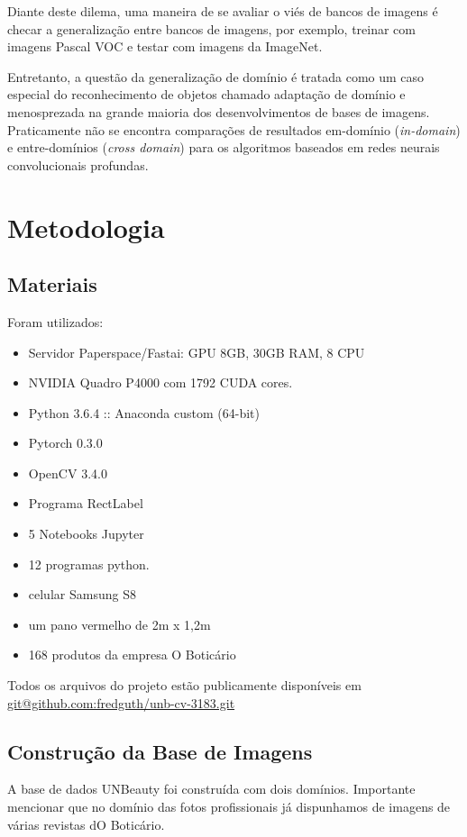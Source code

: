 \documentclass[conference]{IEEEtran}
\begin{document}
Diante deste dilema, uma maneira de se avaliar o viés de bancos de imagens é checar a generalização entre bancos de imagens, por exemplo, treinar com imagens Pascal VOC e testar com imagens da ImageNet\cite{bias}.

Entretanto, a questão da generalização de domínio é tratada como um caso especial do reconhecimento de objetos chamado adaptação de domínio e menosprezada na grande maioria dos desenvolvimentos de bases de imagens. Praticamente não se encontra comparações de resultados em-domínio (\textit{in-domain}) e entre-domínios (\textit{cross domain}) para os algoritmos baseados em redes neurais convolucionais profundas. 

\section{Metodologia}\label{metodologia}

\subsection{Materiais}
Foram utilizados:
\begin{itemize}
  \item Servidor Paperspace/Fastai: GPU 8GB, 30GB RAM, 8 CPU
  \item NVIDIA Quadro P4000 com 1792 CUDA cores.
  \item Python 3.6.4 :: Anaconda custom (64-bit)
  \item Pytorch 0.3.0
  \item OpenCV 3.4.0
  \item Programa RectLabel
  \item 5 Notebooks Jupyter
  \item 12 programas python.
  \item celular Samsung S8
  \item um pano vermelho de 2m x 1,2m
  \item 168 produtos da empresa O Boticário
\end{itemize}
Todos os arquivos do projeto estão publicamente disponíveis em  \url{git@github.com:fredguth/unb-cv-3183.git}\label{repo}

\subsection{Construção da Base de Imagens}

A base de dados UNBeauty foi construída com dois domínios. Importante mencionar que no domínio das fotos profissionais já dispunhamos de imagens de várias revistas dO Boticário.
\end{document}
